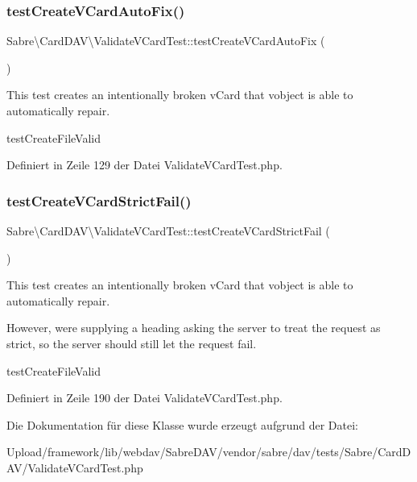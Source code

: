 \subsubsection{\texorpdfstring{test\+Create\+V\+Card\+Auto\+Fix()}{testCreateVCardAutoFix()}}
{\footnotesize\ttfamily Sabre\textbackslash{}\+Card\+D\+A\+V\textbackslash{}\+Validate\+V\+Card\+Test\+::test\+Create\+V\+Card\+Auto\+Fix (\begin{DoxyParamCaption}{ }\end{DoxyParamCaption})}

This test creates an intentionally broken v\+Card that vobject is able to automatically repair.

test\+Create\+File\+Valid 

Definiert in Zeile 129 der Datei Validate\+V\+Card\+Test.\+php.

\mbox{\label{class_sabre_1_1_card_d_a_v_1_1_validate_v_card_test_a95230e1ac9e3dfaab100187f586c56a5}} 
\subsubsection{\texorpdfstring{test\+Create\+V\+Card\+Strict\+Fail()}{testCreateVCardStrictFail()}}
{\footnotesize\ttfamily Sabre\textbackslash{}\+Card\+D\+A\+V\textbackslash{}\+Validate\+V\+Card\+Test\+::test\+Create\+V\+Card\+Strict\+Fail (\begin{DoxyParamCaption}{ }\end{DoxyParamCaption})}

This test creates an intentionally broken v\+Card that vobject is able to automatically repair.

However, we\textquotesingle{}re supplying a heading asking the server to treat the request as strict, so the server should still let the request fail.

test\+Create\+File\+Valid 

Definiert in Zeile 190 der Datei Validate\+V\+Card\+Test.\+php.



Die Dokumentation für diese Klasse wurde erzeugt aufgrund der Datei\+:\begin{DoxyCompactItemize}
\item 
Upload/framework/lib/webdav/\+Sabre\+D\+A\+V/vendor/sabre/dav/tests/\+Sabre/\+Card\+D\+A\+V/Validate\+V\+Card\+Test.\+php\end{DoxyCompactItemize}
